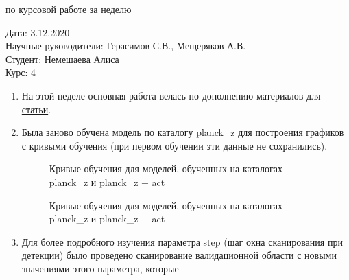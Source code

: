 \documentclass{article}
\begin{document}
\begin{center}{ по курсовой работе за неделю\\}\end{center}
Дата: 3.12.2020\\
Научные руководители: Герасимов С.В., Мещеряков А.В.\\
Студент: Немешаева Алиса\\
Курс: 4\\

\renewcommand{\labelitemi}{$\blacksquare$}
\renewcommand\labelitemii{$\square$}
\begin{enumerate}
    \item На этой неделе основная работа велась по дополнению материалов для 
        \href{https://www.overleaf.com/read/zcgvtyscsyhv}{статьи}.\\
    \item Была заново обучена модель по каталогу planck\_z для построения графиков с кривыми 
        обучения (при первом обучении эти данные не сохранились).\\
        \begin{figure}[h]
            \caption{Кривые обучения для моделей, обученных на каталогах planck\_z и planck\_z + act}
        \end{figure}
        \begin{figure}[h]
            \caption{Кривые обучения для моделей, обученных на каталогах planck\_z и planck\_z + act}
        \end{figure}
    \item Для более подробного изучения параметра step (шаг окна сканирования при детекции) было 
        проведено сканирование валидационной области с новыми значениями этого параметра, которые 

\end{enumerate}
\end{document}
